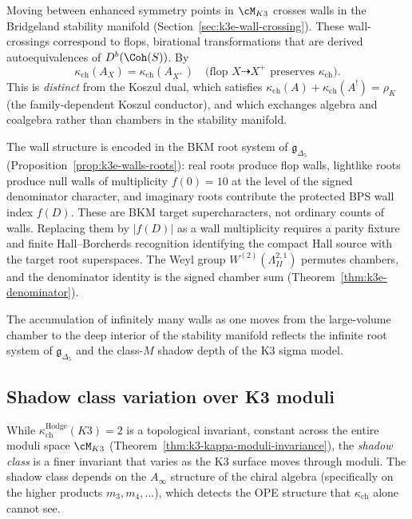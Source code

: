 \begin{remark}
\label{rem:k3-wall-crossing-kappa}
Moving between enhanced symmetry points in $\cM_{K3}$ crosses walls
in the Bridgeland stability manifold
(Section~\ref{sec:k3e-wall-crossing}). These wall-crossings
correspond to flops, birational transformations that are
derived autoequivalences of $D^b(\Coh(S))$. By
\[
 \kappa_{\mathrm{ch}}(A_X) = \kappa_{\mathrm{ch}}(A_{X^+})
 \quad \text{(flop $X \dashrightarrow X^+$ preserves $\kappa_{\mathrm{ch}}$)}.
\]
This is \emph{distinct} from the Koszul dual, which satisfies
$\kappa_{\mathrm{ch}}(A) + \kappa_{\mathrm{ch}}(A^!) = \rho_K$
(the family-dependent Koszul conductor), and which exchanges
algebra and coalgebra rather than chambers in the stability manifold.

The wall structure is encoded in the BKM root system of
$\mathfrak{g}_{\Delta_5}$
(Proposition~\ref{prop:k3e-walls-roots}): real roots produce
flop walls, lightlike roots produce null walls of multiplicity
$f(0) = 10$ at the level of the signed denominator character, and
imaginary roots contribute the protected BPS wall index $f(D)$.
These are BKM target supercharacters, not ordinary counts of walls.
Replacing them by $|f(D)|$ as a wall multiplicity requires a parity
fixture and finite Hall--Borcherds recognition identifying the compact
Hall source with the target root superspaces. The Weyl group
$W^{(2)}(\Lambda^{2,1}_{II})$ permutes chambers, and the denominator
identity is the signed chamber sum
(Theorem~\ref{thm:k3e-denominator}).

The accumulation of infinitely many walls as one moves from
the large-volume chamber to the deep interior of the stability
manifold reflects the infinite root system of $\mathfrak{g}_{\Delta_5}$
and the class-$M$ shadow depth of the K3 sigma model.
\end{remark}


\subsection{Shadow class variation over K3 moduli}
\label{subsec:shadow-class-moduli-variation}

While $\kappa_{\mathrm{ch}}^{\mathrm{Hodge}}(K3) = 2$ is a topological invariant, constant
across the entire moduli space $\cM_{K3}$
(Theorem~\ref{thm:k3-kappa-moduli-invariance}), the
\emph{shadow class} is a finer invariant that varies as the K3 surface
moves through moduli. The shadow class depends on the $A_\infty$
structure of the chiral algebra (specifically on the higher products
$m_3, m_4, \dotsc$), which detects the OPE structure that
$\kappa_{\mathrm{ch}}$ alone cannot see.

